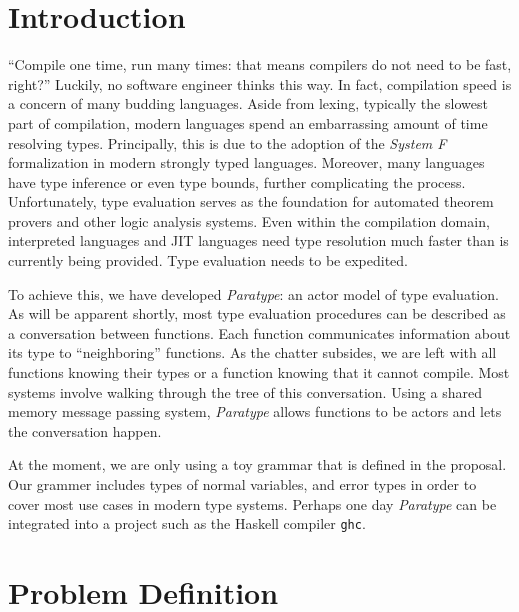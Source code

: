 \documentclass{acm_proc_article-sp}
\begin{document}

\section{Introduction}


``Compile one time, run many times: that means compilers do not need to be
fast, right?'' Luckily, no software engineer thinks this way. In fact,
compilation speed is a concern of many budding languages. Aside from lexing,
typically the slowest part of compilation, modern
languages spend an embarrassing amount of time resolving
types. %
Principally, this is due to the adoption of the
\emph{System F} formalization in modern strongly typed languages. Moreover,
many languages have type inference or even type bounds, further complicating
the process. Unfortunately, type evaluation serves as the foundation for
automated theorem provers and other logic analysis systems. Even within the
compilation domain, interpreted languages and JIT languages need type
resolution much faster than is currently being provided. Type evaluation needs
to be expedited.

To achieve this, we have developed \emph{Paratype}: an actor model of
type evaluation. As will be apparent shortly, most type evaluation procedures
can be described as a conversation between functions. Each function
communicates information about its type to ``neighboring'' functions. As the
chatter subsides, we are left with all functions knowing their types or a
function knowing that it cannot compile. Most systems involve walking through
the tree of this conversation. Using a shared memory message passing system,
\emph{Paratype} allows functions to be actors and lets the conversation
happen.

At the moment, we are only using a toy grammar that is defined in the
proposal. Our grammer includes types of normal variables, and error types in
order to cover most use cases in modern type systems. Perhaps one day
\emph{Paratype} can be integrated into a project such as the Haskell
compiler \texttt{ghc}.

\section{Problem Definition}
\label{sec:problem}
\end{document}
